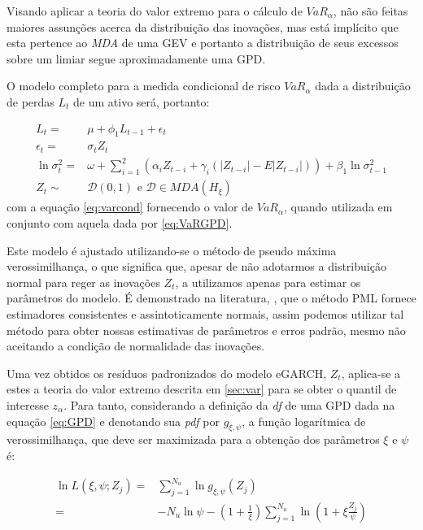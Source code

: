 \documentclass[review]{elsarticle}
\theoremstyle{definition}
\begin{document}
Visando aplicar a teoria do valor extremo para o cálculo de $VaR_\alpha$, não são feitas maiores assunções acerca da distribuição das inovações, mas está implícito que esta pertence ao \emph{MDA} de uma GEV e portanto a distribuição de seus excessos sobre um limiar segue aproximadamente uma GPD.

O modelo completo para a medida condicional de risco $VaR_\alpha$ dada a distribuição de perdas $L_t$ de um ativo será, portanto:

\begin{align}
L_t=&\mu+ \phi_1 L_{t-1}+\epsilon_t \\
\epsilon_t=&\sigma_t Z_t\\
\ln\sigma_t^2=&\omega+ \sum_{i=1}^{2}\left(\alpha_i Z_{t-i}+ \gamma_i(|Z_{t-i}|-E|Z_{t-i}|)\right)+ \beta_1 \ln\sigma_{t-1}^2 \label{eq:sigma2} \\
Z_t\sim &\mathcal{D}(0,1) \text{ e } \mathcal{D} \in MDA(H_\xi)
\end{align}
com a equação \eqref{eq:varcond} fornecendo o valor de $VaR_\alpha$, quando utilizada em conjunto com aquela dada por \eqref{eq:VaRGPD}.

Este modelo é ajustado utilizando-se o método de pseudo máxima verossimilhança, o que significa que, apesar de não adotarmos a distribuição normal para reger as inovações $Z_t$, a utilizamos apenas para estimar os parâmetros do modelo. É demonstrado na literatura, \cite[Capítulo 4]{Gourieroux1997}, que o método PML fornece estimadores consistentes e assintoticamente normais, assim podemos utilizar tal método para obter nossas estimativas de parâmetros e erros padrão, mesmo não aceitando a condição de normalidade das inovações.

Uma vez obtidos os resíduos padronizados do modelo eGARCH, $Z_t$, aplica-se a estes a teoria do valor extremo descrita em \ref{sec:var} para se obter o quantil de interesse $z_\alpha$. Para tanto, considerando a definição da \emph{df} de uma GPD dada na equação \eqref{eq:GPD} e denotando sua \emph{pdf} por $g_{\xi, \psi}$, a função logarítmica de verossimilhança, que deve ser maximizada para a obtenção dos parâmetros $\xi$ e $\psi$ é:

\begin{align}
\label{eq:gpdloglik}
\ln L(\xi, \psi; Z_j)=&\sum\limits_{j=1}^{N_u}\ln g_{\xi, \psi}(Z_j)\nonumber\\
					   =&-N_u \ln \psi-\left(1+\frac{1}{\xi}\right)\sum\limits_{j=1}^{N_u}\ln \left(1+\xi\frac{Z_j}{\psi}\right) 
\end{align}
\end{document}
